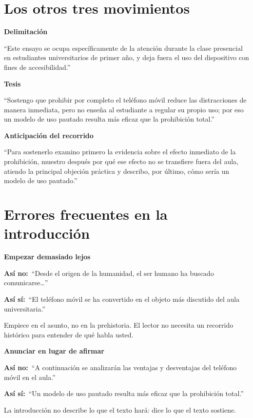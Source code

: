 \documentclass[12pt,a4paper,openany]{report}
\newenvironment{ejemplo}[1]
	{\begin{lrbox}{\cajaguardada}\begin{minipage}{\dimexpr\textwidth-2\fboxsep\relax}\vspace{4pt}\textcolor{verdeejemplo}{\textbf{\sffamily\small #1}}\par\vspace{3pt}\small}
	{\vspace{4pt}\end{minipage}\end{lrbox}\par\vspace{4pt}\noindent\colorbox{cremaejemplo}{\usebox{\cajaguardada}}\par\vspace{8pt}}
\newcommand{\mal}{\textcolor{rojoerror}{\textbf{\sffamily\small As\'i no:}}\ }
\newcommand{\bien}{\textcolor{verdeejemplo}{\textbf{\sffamily\small As\'i s\'i:}}\ }
\begin{document}
\section{Los otros tres movimientos}

\begin{ejemplo}{Delimitaci\'on}
``Este ensayo se ocupa espec\'ificamente de la atenci\'on durante la clase presencial en estudiantes universitarios de primer a\~no, y deja fuera el uso del dispositivo con fines de accesibilidad.''
\end{ejemplo}

\begin{ejemplo}{Tesis}
``Sostengo que prohibir por completo el tel\'efono m\'ovil reduce las distracciones de manera inmediata, pero no ense\~na al estudiante a regular su propio uso; por eso un modelo de uso pautado resulta m\'as eficaz que la prohibici\'on total.''
\end{ejemplo}

\begin{ejemplo}{Anticipaci\'on del recorrido}
``Para sostenerlo examino primero la evidencia sobre el efecto inmediato de la prohibici\'on, muestro despu\'es por qu\'e ese efecto no se transfiere fuera del aula, atiendo la principal objeci\'on pr\'actica y describo, por \'ultimo, c\'omo ser\'ia un modelo de uso pautado.''
\end{ejemplo}

\section{Errores frecuentes en la introducci\'on}

\begin{ejemplo}{Empezar demasiado lejos}
\mal ``Desde el origen de la humanidad, el ser humano ha buscado comunicarse\ldots''

\bien ``El tel\'efono m\'ovil se ha convertido en el objeto m\'as discutido del aula universitaria.''

Empiece en el asunto, no en la prehistoria. El lector no necesita un recorrido hist\'orico para entender de qu\'e habla usted.
\end{ejemplo}

\begin{ejemplo}{Anunciar en lugar de afirmar}
\mal ``A continuaci\'on se analizar\'an las ventajas y desventajas del tel\'efono m\'ovil en el aula.''

\bien ``Un modelo de uso pautado resulta m\'as eficaz que la prohibici\'on total.''

La introducci\'on no describe lo que el texto har\'a: dice lo que el texto sostiene.
\end{ejemplo}
\end{document}
